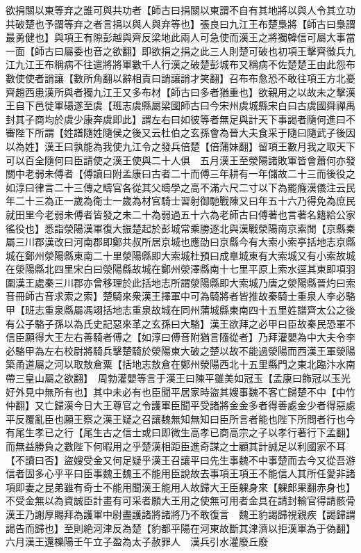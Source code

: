 欲捐關以東等弃之誰可與共功者【師古曰捐關以東謂不自有其地將以與人令其立功共破楚也予謂等弃之者言捐以與人與弃等也】張良曰九江王布楚梟將【師古曰梟謂最勇健也】與項王有隙彭越與齊反梁地此兩人可急使而漢王之將獨韓信可屬大事當一面【師古曰屬委也音之欲翻】即欲捐之捐之此三人則楚可破也初項王擊齊徵兵九江九江王布稱病不往遣將將軍數千人行漢之破楚彭城布又稱病不佐楚楚王由此怨布數使使者誚讓【數所角翻以辭相責曰誚讓誚才笑翻】召布布愈恐不敢往項王方北憂齊趙西患漢所與者獨九江王又多布材【師古曰多者猶重也】欲親用之以故未之擊漢王自下邑徙軍碭遂至虞【班志虞縣屬梁國師古曰今宋州虞城縣宋白曰古虞國舜禪禹封其子商均於虞少康奔虞即此】謂左右曰如彼等者無足與計天下事謁者隨何進曰不審陛下所謂【姓譜隨姓隨侯之後又云杜伯之玄孫會為晉大夫食采于隨曰隨武子後因以為姓】漢王曰孰能為我使九江令之發兵倍楚【倍蒲妹翻】留項王數月我之取天下可以百全隨何曰臣請使之漢王使與二十人俱　五月漢王至滎陽諸敗軍皆會蕭何亦發關中老弱未傅者【傅讀曰附孟康曰古者二十而傅三年耕有一年儲故二十三而後役之如淳曰律言二十三傳之疇官各從其父疇學之高不滿六尺二寸以下為罷癃漢儀注云民年二十三為正一歲為衛士一歲為材官騎士習射御馳戰陳又曰年五十六乃得免為庶民就田里今老弱未傅者皆發之未二十為弱過五十六為老師古曰傅著也言著名籍給公家徭役也】悉詣滎陽漢軍復大振楚起於彭城常乘勝逐北與漢戰滎陽南京索閒【京縣秦屬三川郡漢改曰河南郡即鄭共叔所居京城也應劭曰京縣今有大索小索亭括地志京縣城在鄭州滎陽縣東南二十里滎陽縣即大索城杜預曰成臯城東有大索城又有小索故城在滎陽縣北四里宋白曰滎陽縣故城在鄭州滎澤縣南十七里平原上索水逕其東即項羽圍漢王處秦三川郡亦曾移理於此括地志所謂滎陽縣即大索城乃唐之滎陽縣晉灼曰索音冊師古音求索之索】楚騎來衆漢王擇軍中可為騎將者皆推故秦騎士重泉人李必駱甲【班志重泉縣屬馮翊括地志重泉故城在同州蒲城縣東南四十五里姓譜齊太公之後有公子駱子孫以為氏史記惡來革之玄孫曰大駱】漢王欲拜之必甲曰臣故秦民恐軍不信臣願得大王左右善騎者傅之【如淳曰傅音附猶言隨從者】乃拜灌嬰為中大夫令李必駱甲為左右校尉將騎兵擊楚騎於滎陽東大破之楚以故不能過滎陽而西漢王軍滎陽築甬道屬之河以取敖倉粟【括地志敖倉在鄭州滎陽西北十五里縣門之東北臨汴水南帶三皇山屬之欲翻】　周勃灌嬰等言于漢王曰陳平雖美如冠玉【孟康曰飾冠以玉光好外見中無所有也】其中未必有也臣聞平居家時盜其嫂事魏不客亡歸楚不中【中竹仲翻】又亡歸漢今日大王尊官之令護軍臣聞平受諸將金金多者得善處金少者得惡處平反覆亂臣也願王察之漢王疑之召讓魏無知無知曰臣所言者能也陛下所問者行也今有尾生孝已之行【尾生古之信士或曰即微生高孝已商高宗之子以孝行著行下孟翻】而無益勝負之數陛下何暇用之乎楚漢相距臣進奇謀之士顧其計誠足以利國家不耳【不讀曰否】盜嫂受金又何足疑乎漢王召讓平曰先生事魏不中事楚而去今又從吾游信者固多心乎平曰臣事魏王魏王不能用臣說故去事項王項王不能信人其所任愛非諸項即妻之昆弟雖有奇士不能用聞漢王能用人故歸大王臣躶身來【躶郎果翻赤身也】不受金無以為資誠臣計畫有可采者願大王用之使無可用者金具在請封輸官得請骸骨漢王乃謝厚賜拜為護軍中尉盡護諸將諸將乃不敢復言　魏王豹謁歸視親疾【謁歸謂謁告而歸也】至則絶河津反為楚【豹都平陽在河東故斷其津濟以拒漢軍為于偽翻】六月漢王還櫟陽壬午立子盈為太子赦罪人　漢兵引水灌廢丘廢

